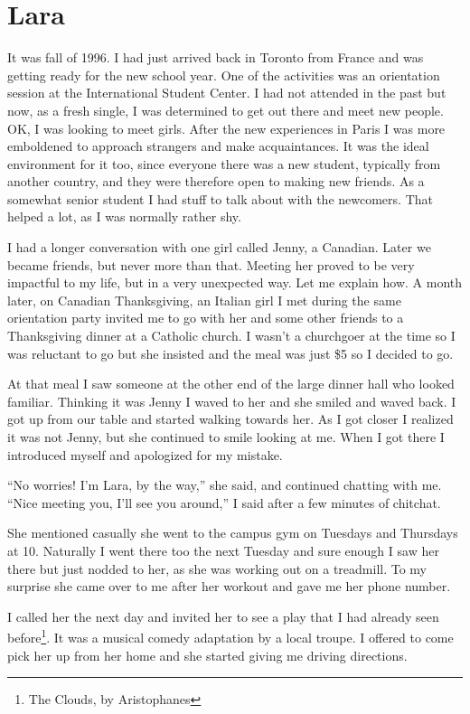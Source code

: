 \documentclass[12pt]{book}
\begin{document}
\section{Lara}

It was fall of 1996. I had just arrived back in Toronto from France and
was getting ready for the new school year. One of the activities was an
orientation session at the International Student Center. I had not
attended in the past but now, as a fresh single, I was determined to get
out there and meet new people. OK, I was looking to meet girls. After
the new experiences in Paris I was more emboldened to approach strangers
and make acquaintances. It was the ideal environment for it too, since
everyone there was a new student, typically from another country, and
they were therefore open to making new friends. As a somewhat senior
student I had stuff to talk about with the newcomers. That helped a lot,
as I was normally rather shy.

I had a longer conversation with one girl called Jenny, a Canadian.
Later we became friends, but never more than that. Meeting her proved to
be very impactful to my life, but in a very unexpected way. Let me
explain how. A month later, on Canadian Thanksgiving, an Italian girl I
met during the same orientation party invited me to go with her and some
other friends to a Thanksgiving dinner at a Catholic church. I wasn't a
churchgoer at the time so I was reluctant to go but she insisted and the
meal was just \$5 so I decided to go.

At that meal I saw someone at the other end of the large dinner hall who
looked familiar. Thinking it was Jenny I waved to her and she smiled and
waved back. I got up from our table and started walking towards her. As
I got closer I realized it was not Jenny, but she continued to smile
looking at me. When I got there I introduced myself and apologized for
my mistake.

``No worries! I'm Lara, by the way,'' she said, and continued chatting
with me. ``Nice meeting you, I'll see you around,'' I said after a few
minutes of chitchat.

She mentioned casually she went to the campus gym on Tuesdays and
Thursdays at 10. Naturally I went there too the next Tuesday and sure
enough I saw her there but just nodded to her, as she was working out on
a treadmill. To my surprise she came over to me after her workout and
gave me her phone number.

I called her the next day and invited her to see a play that I had
already seen before\footnote{
  The Clouds, by Aristophanes}. It was a musical comedy adaptation by a
local troupe. I offered to come pick her up from her home and she
started giving me driving directions.
\end{document}
